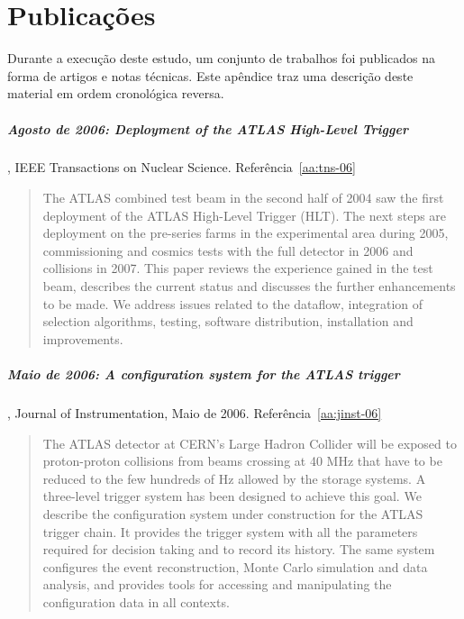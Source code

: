 \typeout{ ====================================================================}
\typeout{ ====================================================================}

\newcommand{\sectioneng}[1]{\foreignlanguage{english}{#1\/}}

\chapter{Publicações}
\label{chap:published}

Durante a execução deste estudo, um conjunto de trabalhos foi publicados na
forma de artigos e notas técnicas. Este apêndice traz uma descrição deste
material em ordem cronológica reversa.

\paragraph{Agosto de 2006: \sectioneng{Deployment of the ATLAS High-Level
Trigger}}, IEEE Transactions on Nuclear Science. Referência~\ref{aa:tns-06}

\begin{quotation}
The ATLAS combined test beam in the second half of 2004 saw the first
deployment of the ATLAS High-Level Trigger (HLT). The next steps are
deployment on the pre-series farms in the experimental area during 2005,
commissioning and cosmics tests with the full detector in 2006 and collisions
in 2007. This paper reviews the experience gained in the test beam, describes
the current status and discusses the further enhancements to be made. We
address issues related to the dataflow, integration of selection algorithms,
testing, software distribution, installation and improvements.
\end{quotation}

\paragraph{Maio de 2006: \sectioneng{A configuration system for the ATLAS
trigger}}, Journal of Instrumentation, Maio de
2006. Referência~\ref{aa:jinst-06}

\begin{quotation}
The ATLAS detector at CERN's Large Hadron Collider will be exposed to
proton-proton collisions from beams crossing at 40 MHz that have to be
reduced to the few hundreds of Hz allowed by the storage systems. A
three-level trigger system has been designed to achieve this goal. We describe
the configuration system under construction for the ATLAS trigger chain. It
provides the trigger system with all the parameters required for decision
taking and to record its history. The same system configures the event
reconstruction, Monte Carlo simulation and data analysis, and provides tools
for accessing and manipulating the configuration data in all contexts.
\end{quotation}

